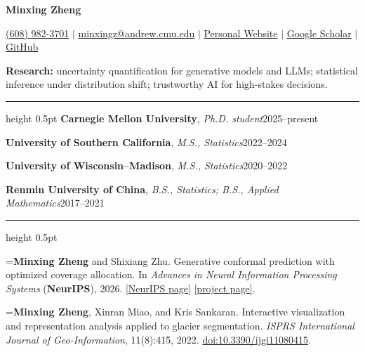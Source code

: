 \documentclass[11pt,letterpaper]{article}
\newcommand{\cvsection}[1]{\par\vspace{6pt}{\large\bfseries\scshape #1}\par\vspace{1.5pt}\hrule height 0.5pt\vspace{5pt}}
\newcommand{\cvsub}[1]{\par\vspace{3pt}{\itshape #1}\par\vspace{2pt}}
\newlength{\reflabel}\setlength{\reflabel}{2.7em}
\newcommand{\pub}[2]{\par\hangindent=\reflabel\hangafter=1\noindent\makebox[\reflabel][l]{[#1]}#2\par\vspace{0.8pt}}
\newcommand{\me}{\textbf{Minxing Zheng}}
\begin{document}
\raggedright
\begin{center}
  {\LARGE\bfseries Minxing Zheng}\par\vspace{5pt}
  \href{tel:+16089823701}{(608) 982-3701}
  \enspace$\vert$\enspace
  \href{mailto:minxingz@andrew.cmu.edu}{minxingz@andrew.cmu.edu}
  \enspace$\vert$\enspace
  \href{https://minxing-zheng.github.io/}{Personal Website}
  \enspace$\vert$\enspace
  \href{https://scholar.google.com/citations?user=JM-PxSQAAAAJ\&hl=en}{Google Scholar}
  \enspace$\vert$\enspace
  \href{https://github.com/Minxing-Zheng}{GitHub}\par\vspace{4pt}
  \textbf{Research:} uncertainty quantification for generative models and LLMs; statistical inference under distribution shift; trustworthy AI for high-stakes decisions.
\end{center}

\cvsection{Education}
\textbf{Carnegie Mellon University}, \emph{Ph.D. student}\hfill 2025--present\par\vspace{2pt}
\textbf{University of Southern California}, \emph{M.S., Statistics}\hfill 2022--2024\par\vspace{2pt}
\textbf{University of Wisconsin--Madison}, \emph{M.S., Statistics}\hfill 2020--2022\par\vspace{2pt}
\textbf{Renmin University of China}, \emph{B.S., Statistics; B.S., Applied Mathematics}\hfill 2017--2021\par

\cvsection{Publications}
\cvsub{Conference and Journal Papers}
\pub{C1}{\me{} and Shixiang Zhu. Generative conformal prediction with optimized coverage allocation. In \emph{Advances in Neural Information Processing Systems} (\textbf{NeurIPS}), 2026. \href{https://neurips.cc/virtual/2026/poster/149988}{[NeurIPS page]} \href{https://minxing-zheng.github.io/orca/}{[project page]}.}
\pub{J1}{\me{}, Xinran Miao, and Kris Sankaran. Interactive visualization and representation analysis applied to glacier segmentation. \emph{ISPRS International Journal of Geo-Information}, 11(8):415, 2022. \href{https://doi.org/10.3390/ijgi11080415}{doi:10.3390/ijgi11080415}.}
\end{document}
